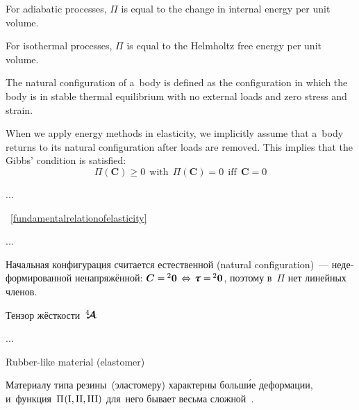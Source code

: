 \begin{otherlanguage}{russian}
{For adiabatic processes, ${\Pi}$ is equal to the change in internal energy per unit volume.

For isothermal processes, ${\Pi}$ is equal to the Helmholtz free energy per unit volume.

The natural configuration of a~body is defined as the configuration in which the body is in stable thermal equilibrium with no external loads and zero stress and strain.

When we apply energy methods in elasticity, we implicitly assume that a~body returns to its natural configuration after loads are removed. This implies that the Gibbs’ condition is satisfied:
\[ \Pi({\boldsymbol{\bm{C}}}) \geq 0~~{\text{with}}~~\Pi({\boldsymbol{\bm{C}}}) = 0~~{\text{iff}}~~{\boldsymbol{\bm{C}}} = 0 \]

\par}

...






~\eqref{fundamentalrelationofelasticity}

...

\noindent Начальная конфигурация считается естественной (natural configuration)~--- недеформированной ненапряжённой: ${\bm{C} = \hspace{-0.1ex} {^2\bm{0}} \hspace{.4ex} \Leftrightarrow \hspace{.2ex} \cauchystress = \hspace{-0.2ex} {^2\bm{0}}}$, поэтому в~$\Pi$ нет линейных членов.

Тензор жёсткости~$\hspace{.08ex}{^4\hspace{-0.72ex}\bm{\mathcal{A}}}\hspace{.08ex}$

...

Rubber\hbox{-}like material (elastomer)

Материалу типа резины~(эластомеру) характерны больш\'{и}е деформации, и~функция~${\Pi\hspace{.12ex}(\mathrm{I}, \mathrm{II}, \mathrm{III})}$ для~него бывает весьма сложной~\cite{haroldalexander-rubberlike}.


\end{otherlanguage}
